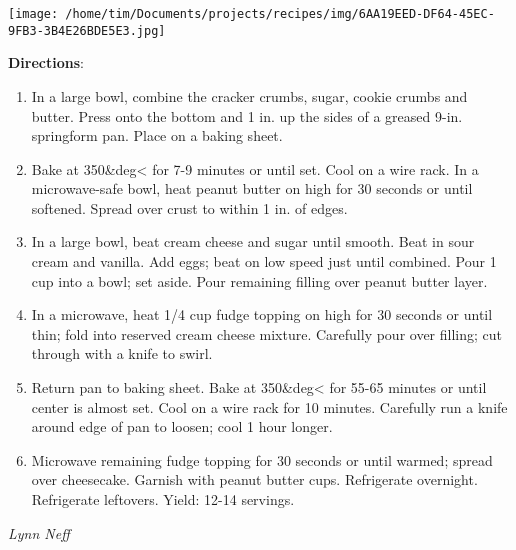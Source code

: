 \documentclass[11pt, twoside, openany]{book}
\begin{document}
\begin{minipage}[t]{0.2\linewidth}
\centering \strut\vspace*{-\baselineskip}\newline
\texttt{[image: /home/tim/Documents/projects/recipes/img/6AA19EED-DF64-45EC-9FB3-3B4E26BDE5E3.jpg]}\\
\end{minipage}\vspace{3mm}
\textbf{Directions}:
\vspace{-3mm}\begin{enumerate}\setlength\itemsep{-1mm}
\item In a large bowl, combine the cracker crumbs, sugar, cookie crumbs and butter. Press onto the bottom and 1 in. up the sides of a greased 9-in. springform pan. Place on a baking sheet. 
\item  Bake at 350&deg< for 7-9 minutes or until set. Cool on a wire rack. In a microwave-safe bowl, heat peanut butter on high for 30 seconds or until softened. Spread over crust to within 1 in. of edges. 
\item  In a large bowl, beat cream cheese and sugar until smooth. Beat in sour cream and vanilla. Add eggs; beat on low speed just until combined. Pour 1 cup into a bowl; set aside. Pour remaining filling over peanut butter layer. 
\item  In a microwave, heat 1/4 cup fudge topping on high for 30 seconds or until thin; fold into reserved cream cheese mixture. Carefully pour over filling; cut through with a knife to swirl. 
\item  Return pan to baking sheet. Bake at 350&deg< for 55-65 minutes or until center is almost set. Cool on a wire rack for 10 minutes. Carefully run a knife around edge of pan to loosen; cool 1 hour longer. 
\item  Microwave remaining fudge topping for 30 seconds or until warmed; spread over cheesecake. Garnish with peanut butter cups. Refrigerate overnight. Refrigerate leftovers. Yield: 12-14 servings.
\end{enumerate}
 \label{oriental-chicken-salad}\hfill\textit{Lynn Neff}\\
\end{document}

